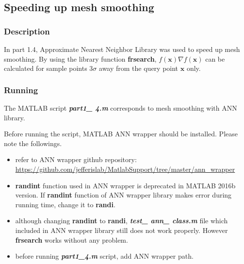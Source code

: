 \documentclass[paper=a4, fontsize=11pt]{scrartcl} %
\numberwithin{equation}{section} %
\numberwithin{figure}{section} %
\numberwithin{table}{section} %
\newcommand{\filename}[1]{\textbf{\textit{#1}}}
\newcommand{\funcname}[1]{\textbf{#1}}
\renewcommand{\vec}[1]{\mathbf{#1}}
\begin{document}
\pagebreak

\subsection{Speeding up mesh smoothing}

\subsubsection{Description}

In part 1.4, Approximate Nearest Neighbor Library was used to speed up mesh smoothing. By using the library function \funcname{frsearch}, $f(\vec{x}) \nabla f(\vec{x})$ can be calculated for sample points $3\sigma$ away from the query point $\vec{x}$ only. 

\subsubsection{Running}

The MATLAB script \filename{part1\_ 4.m} corresponds to mesh smoothing with ANN library. 

Before running the script, MATLAB ANN wrapper should be installed. Please note the followings. 

\begin{itemize}
\item refer to ANN wrapper github repository: \url{https://github.com/jefferislab/MatlabSupport/tree/master/ann_wrapper}
\item \funcname{randint} function used in ANN wrapper is deprecated in MATLAB 2016b version. If \funcname{randint} function of ANN wrapper library makes error during running time, change it to \funcname{randi}.
\item although changing \funcname{randint} to \funcname{randi}, \filename{test\_ ann\_ class.m} file which included in ANN wrapper library still does not work properly. However \funcname{frsearch} works without any problem. 
\item before running \filename{part1\_4.m} script, add ANN wrapper path.
\end{itemize}
\end{document}
